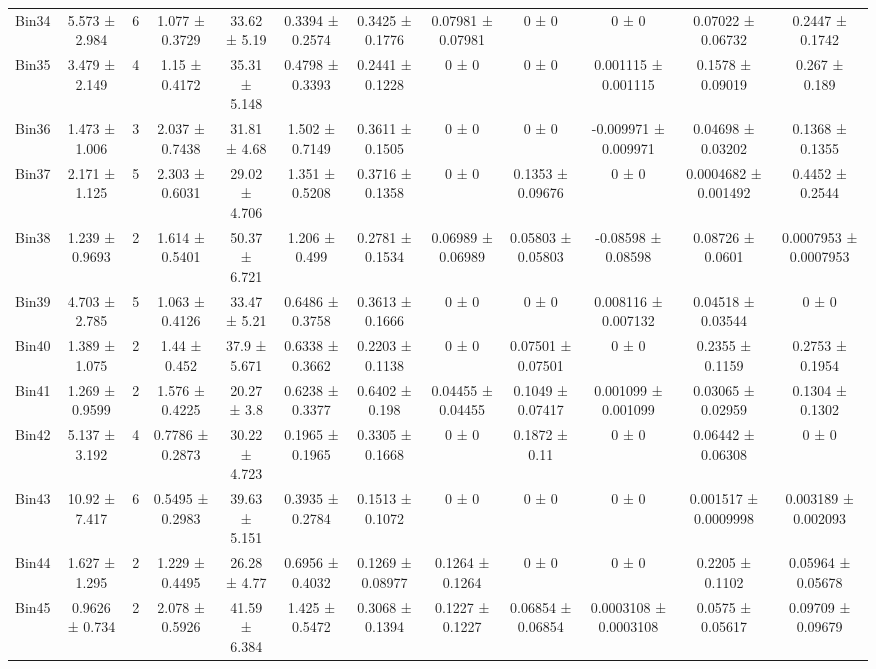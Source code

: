\begin{tabular}{@{\extracolsep{4pt}}lccccccccccc@{}}
     Bin34 & 5.573 ± 2.984 & 6 & 1.077 ± 0.3729 & 33.62 ± 5.19 & 0.3394 ± 0.2574 & 0.3425 ± 0.1776 & 0.07981 ± 0.07981 & 0 ± 0 & 0 ± 0 & 0.07022 ± 0.06732 & 0.2447 ± 0.1742 \\ 
     Bin35 & 3.479 ± 2.149 & 4 & 1.15 ± 0.4172 & 35.31 ± 5.148 & 0.4798 ± 0.3393 & 0.2441 ± 0.1228 & 0 ± 0 & 0 ± 0 & 0.001115 ± 0.001115 & 0.1578 ± 0.09019 & 0.267 ± 0.189 \\ 
     Bin36 & 1.473 ± 1.006 & 3 & 2.037 ± 0.7438 & 31.81 ± 4.68 & 1.502 ± 0.7149 & 0.3611 ± 0.1505 & 0 ± 0 & 0 ± 0 & -0.009971 ± 0.009971 & 0.04698 ± 0.03202 & 0.1368 ± 0.1355 \\ 
     Bin37 & 2.171 ± 1.125 & 5 & 2.303 ± 0.6031 & 29.02 ± 4.706 & 1.351 ± 0.5208 & 0.3716 ± 0.1358 & 0 ± 0 & 0.1353 ± 0.09676 & 0 ± 0 & 0.0004682 ± 0.001492 & 0.4452 ± 0.2544 \\ 
     Bin38 & 1.239 ± 0.9693 & 2 & 1.614 ± 0.5401 & 50.37 ± 6.721 & 1.206 ± 0.499 & 0.2781 ± 0.1534 & 0.06989 ± 0.06989 & 0.05803 ± 0.05803 & -0.08598 ± 0.08598 & 0.08726 ± 0.0601 & 0.0007953 ± 0.0007953 \\ 
     Bin39 & 4.703 ± 2.785 & 5 & 1.063 ± 0.4126 & 33.47 ± 5.21 & 0.6486 ± 0.3758 & 0.3613 ± 0.1666 & 0 ± 0 & 0 ± 0 & 0.008116 ± 0.007132 & 0.04518 ± 0.03544 & 0 ± 0 \\ 
     Bin40 & 1.389 ± 1.075 & 2 & 1.44 ± 0.452 & 37.9 ± 5.671 & 0.6338 ± 0.3662 & 0.2203 ± 0.1138 & 0 ± 0 & 0.07501 ± 0.07501 & 0 ± 0 & 0.2355 ± 0.1159 & 0.2753 ± 0.1954 \\ 
     Bin41 & 1.269 ± 0.9599 & 2 & 1.576 ± 0.4225 & 20.27 ± 3.8 & 0.6238 ± 0.3377 & 0.6402 ± 0.198 & 0.04455 ± 0.04455 & 0.1049 ± 0.07417 & 0.001099 ± 0.001099 & 0.03065 ± 0.02959 & 0.1304 ± 0.1302 \\ 
     Bin42 & 5.137 ± 3.192 & 4 & 0.7786 ± 0.2873 & 30.22 ± 4.723 & 0.1965 ± 0.1965 & 0.3305 ± 0.1668 & 0 ± 0 & 0.1872 ± 0.11 & 0 ± 0 & 0.06442 ± 0.06308 & 0 ± 0 \\ 
     Bin43 & 10.92 ± 7.417 & 6 & 0.5495 ± 0.2983 & 39.63 ± 5.151 & 0.3935 ± 0.2784 & 0.1513 ± 0.1072 & 0 ± 0 & 0 ± 0 & 0 ± 0 & 0.001517 ± 0.0009998 & 0.003189 ± 0.002093 \\ 
     Bin44 & 1.627 ± 1.295 & 2 & 1.229 ± 0.4495 & 26.28 ± 4.77 & 0.6956 ± 0.4032 & 0.1269 ± 0.08977 & 0.1264 ± 0.1264 & 0 ± 0 & 0 ± 0 & 0.2205 ± 0.1102 & 0.05964 ± 0.05678 \\ 
     Bin45 & 0.9626 ± 0.734 & 2 & 2.078 ± 0.5926 & 41.59 ± 6.384 & 1.425 ± 0.5472 & 0.3068 ± 0.1394 & 0.1227 ± 0.1227 & 0.06854 ± 0.06854 & 0.0003108 ± 0.0003108 & 0.0575 ± 0.05617 & 0.09709 ± 0.09679 \\ 

\end{tabular}
